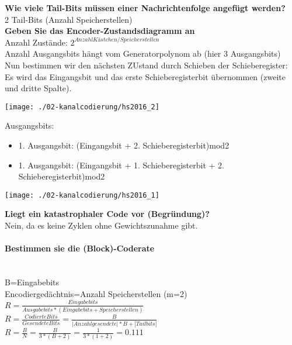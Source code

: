\textbf{Wie viele Tail-Bits müssen einer Nachrichtenfolge angefügt werden?}\\
2 Tail-Bits (Anzahl Speicherstellen)\\

\textbf{Geben Sie das Encoder-Zustandsdiagramm an}\\
Anzahl Zustände: $2^{Anzahl Kästchen/ Speicherstellen}$\\
Anzahl Ausgangsbits hängt vom Generatorpolynom ab (hier 3 Ausgangsbits)\\
Nun bestimmen wir den nächsten ZUstand durch Schieben der Schieberegister: Es wird das Eingangsbit und das erste Schieberegisterbit übernommen (zweite und dritte Spalte).
\begin{center}
    \vspace{-8pt}
    \texttt{[image: ./02-kanalcodierung/hs2016\_2]}
    \vspace{-8pt}
\end{center}

Ausgangsbits:
\begin{itemize}
    \item 1. Ausgangsbit: (Eingangsbit + 2. Schieberegisterbit)mod2
    \item 1. Ausgangsbit: (Eingangsbit + 1. Schieberegisterbit + 2. Schieberegisterbit)mod2
\end{itemize}

\begin{center}
    \vspace{-8pt}
    \texttt{[image: ./02-kanalcodierung/hs2016\_1]}
    \vspace{-8pt}
\end{center}

\textbf{Liegt ein katastrophaler Code vor (Begründung)?}\\
Nein, da es keine Zyklen ohne Gewichtszunahme gibt.

\paragraph{Bestimmen sie die (Block)-Coderate}\mbox{}\\
B=Eingabebits\\
Encodiergedächtnis=Anzahl Speicherstellen (m=2)\\
$R=\frac{Eingabebits}{Ausgabebits*(Eingabebits+Speicherstellen)}$\\
$R=\frac{Codierte Bits}{Gesendete Bits}=\frac{B}{|Anzahl gesendete|*B+|Tailbits|}$\\
$R=\frac{B}{N} = \frac{B}{3*(B+2)}=\frac{1}{3*(1+2)}=0.111$

